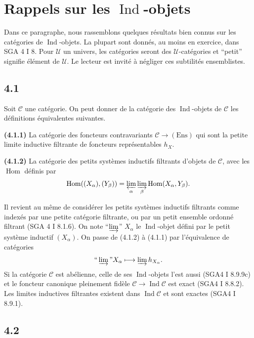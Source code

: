 \documentclass[12pt,a4paper]{article}
\theoremstyle{plain}
\theoremstyle{definition}
\theoremstyle{remark}
\DeclareMathOperator{\Hom}{Hom}
\DeclareMathOperator{\Ind}{Ind}
\providecommand{\Hom}{\operatorname{Hom}}
\providecommand{\limind}{\varinjlim}
\providecommand{\limproj}{\varprojlim}
\begin{document}
\section{Rappels sur les $\Ind$-objets}\label{sec:4}

Dans ce paragraphe, nous rassemblons quelques r\'esultats bien connus sur les
cat\'egories de $\Ind$-objets. La plupart sont donn\'es, au moins en exercice, dans
SGA 4 I 8. Pour $\mathcal{U}$ un univers, les cat\'egories seront des
$\mathcal{U}$-cat\'egories et ``petit'' signifie \'el\'ement de $\mathcal{U}$. Le lecteur
est invit\'e \`a n\'egliger ces subtilit\'es ensemblistes.

\subsection*{4.1}

Soit $\mathcal{C}$ une cat\'egorie. On peut donner de la cat\'egorie des
$\Ind$-objets de $\mathcal{C}$ les d\'efinitions \'equivalentes suivantes.

\textbf{(4.1.1)} La cat\'egorie des foncteurs contravariants $\mathcal{C} \to
(\text{Ens})$ qui sont la petite limite inductive filtrante de foncteurs repr\'esentables
$h_X$.

\textbf{(4.1.2)} La cat\'egorie des petits syst\`emes inductifs filtrants d'objets de
$\mathcal{C}$, avec les $\Hom$ d\'efinis par
\begin{equation}\label{eq:4.1.3}
\Hom((X_\alpha), (Y_\beta)) = \limproj_\alpha \limind_\beta \Hom(X_\alpha, Y_\beta).
\end{equation}

Il revient au m\^eme de consid\'erer les petits syst\`emes inductifs filtrants comme
index\'es par une petite cat\'egorie filtrante, ou par un petit ensemble ordonn\'e filtrant
(SGA 4 I 8.1.6). On note ``$\limind$'' $X_\alpha$ le $\Ind$-objet d\'efini par le petit
syst\`eme inductif $(X_\alpha)$. On passe de (4.1.2) \`a (4.1.1) par l'\'equivalence de
cat\'egories
\[
\text{``}\limind\text{''} X_\alpha \longmapsto \limind h_{X_\alpha}.
\]
Si la cat\'egorie $\mathcal{C}$ est ab\'elienne, celle de ses $\Ind$-objets l'est aussi
(SGA4 I 8.9.9c) et le foncteur canonique pleinement fid\`ele $\mathcal{C} \to
\Ind\mathcal{C}$ est exact (SGA4 I 8.8.2). Les limites inductives filtrantes existent
dans $\Ind\mathcal{C}$ et sont exactes (SGA4 I 8.9.1).

\subsection*{4.2}
\end{document}
